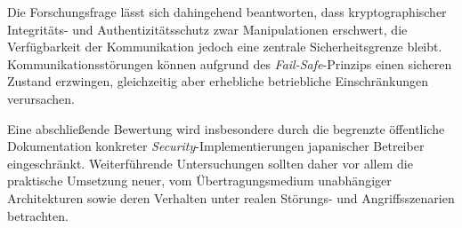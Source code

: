 \documentclass[runningheads]{res/llncs}
\begin{document}
Die Forschungsfrage lässt sich dahingehend beantworten, dass kryptographischer Integritäts- und Authentizitätsschutz zwar Manipulationen erschwert, die Verfügbarkeit der Kommunikation jedoch eine zentrale Sicherheitsgrenze bleibt. Kommunikationsstörungen können aufgrund des \textit{Fail-Safe}-Prinzips einen sicheren Zustand erzwingen, gleichzeitig aber erhebliche betriebliche Einschränkungen verursachen.

Eine abschließende Bewertung wird insbesondere durch die begrenzte öffentliche Dokumentation konkreter \textit{Security}-Implementierungen japanischer Betreiber eingeschränkt. Weiterführende Untersuchungen sollten daher vor allem die praktische Umsetzung neuer, vom Übertragungsmedium unabhängiger Architekturen sowie deren Verhalten unter realen Störungs- und Angriffsszenarien betrachten.

\newpage



\newpage
\printbibliography

% 
% 
\end{document}
